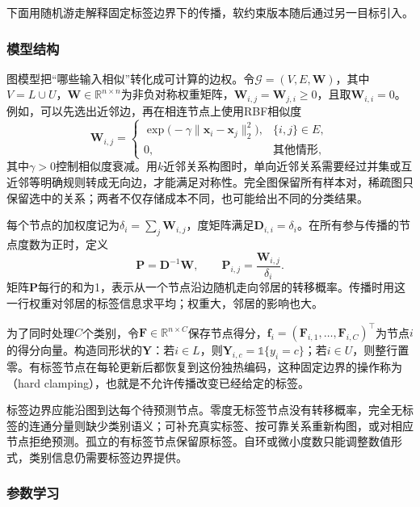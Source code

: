 下面用随机游走解释固定标签边界下的传播，软约束版本随后通过另一目标引入。

\subsubsection{模型结构}
\label{sec:classification-label-propagation-structure}

图模型把“哪些输入相似”转化成可计算的边权。令$\mathcal{G}=(V,E,\bm{W})$，其中$V=L\cup U$，$\bm{W}\in\mathbb{R}^{n\times n}$为非负对称权重矩阵，$\bm{W}_{i,j}=\bm{W}_{j,i}\geq0$，且取$\bm{W}_{i,i}=0$。例如，可以先选出近邻边，再在相连节点上使用RBF相似度
\begin{equation}
  \label{eq:classification-label-propagation-weights}
  \bm{W}_{i,j}=
  \begin{cases}
    \exp\bigl(-\gamma\lVert\bm{x}_i-\bm{x}_j\rVert_2^2\bigr),
      & \{i,j\}\in E,\\
    0, & \text{其他情形},
  \end{cases}
\end{equation}
其中$\gamma>0$控制相似度衰减。用$k$近邻关系构图时，单向近邻关系需要经过并集或互近邻等明确规则转成无向边，才能满足对称性。完全图保留所有样本对，稀疏图只保留选中的关系；两者不仅存储成本不同，也可能给出不同的分类结果。

每个节点的加权度记为$\delta_i=\sum_j\bm{W}_{i,j}$，度矩阵满足$\bm{D}_{i,i}=\delta_i$。在所有参与传播的节点度数为正时，定义
\begin{equation}
  \label{eq:classification-label-propagation-transition}
  \bm{P}=\bm{D}^{-1}\bm{W},
  \qquad
  \bm{P}_{i,j}=\frac{\bm{W}_{i,j}}{\delta_i}.
\end{equation}
矩阵$\bm{P}$每行的和为1，表示从一个节点沿边随机走向邻居的转移概率。传播时用这一行权重对邻居的标签信息求平均；权重大，邻居的影响也大。

为了同时处理$C$个类别，令$\bm{F}\in\mathbb{R}^{n\times C}$保存节点得分，$\bm{f}_i=(\bm{F}_{i,1},\dots,\bm{F}_{i,C})^\top$为节点$i$的得分向量。构造同形状的$\bm{Y}$：若$i\in L$，则$\bm{Y}_{i,c}=\mathbb{1}\{y_i=c\}$；若$i\in U$，则整行置零。有标签节点在每轮更新后都恢复到这份独热编码，这种固定边界的操作称为（hard clamping），也就是不允许传播改变已经给定的标签。

标签边界应能沿图到达每个待预测节点。零度无标签节点没有转移概率，完全无标签的连通分量则缺少类别语义；可补充真实标签、按可靠关系重新构图，或对相应节点拒绝预测。孤立的有标签节点保留原标签。自环或微小度数只能调整数值形式，类别信息仍需要标签边界提供。

\subsubsection{参数学习}
\label{sec:classification-label-propagation-learning}

